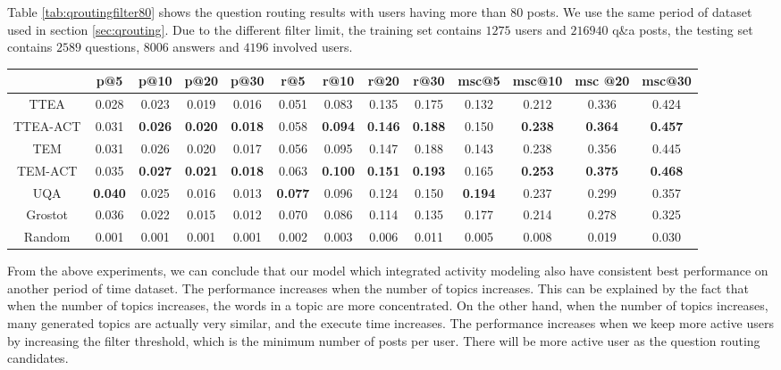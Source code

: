{{{{{{{Table \ref{tab:qroutingfilter80} shows the question routing results with users having more than 80 posts. We use the same period of dataset used in section \ref{sec:qrouting}. Due to the different filter limit, the training set contains $1275$ users and $216940$ q\&a posts, the testing set contains $2589$ questions, $8006$ answers and $4196$ involved users.
\begin{sidewaystable}
\caption{Question Routing experiments,  with users having more than 80 posts}
\label{tab:qroutingfilter80}
\centering
\begin{tabular}{|c|c|c|c|c|c|c|c|c|c|c|c|c|}
\hline
 & p@5    &p@10    &p@20   & p@30 &r@5 & r@10 & r@20 &r@30 & msc@5 & msc@10 &msc @20 &msc@30  \\ \hline
TTEA&0.028&0.023&0.019&0.016&0.051&0.083&0.135&0.175&0.132&0.212&0.336&0.424 \\ \hline
TTEA-ACT&0.031&\textbf{0.026}&\textbf{0.020}&\textbf{0.018}&0.058&\textbf{0.094}&\textbf{0.146}&\textbf{0.188}&0.150&\textbf{0.238}&\textbf{0.364}&\textbf{0.457} \\ \hline
TEM&0.031&0.026&0.020&0.017&0.056&0.095&0.147&0.188&0.143&0.238&0.356&0.445 \\ \hline
TEM-ACT&0.035&\textbf{0.027}&\textbf{0.021}&\textbf{0.018}&0.063&\textbf{0.100}&\textbf{0.151}&\textbf{0.193}&0.165  &\textbf{0.253}&\textbf{0.375}&\textbf{0.468} \\ \hline
UQA&\textbf{0.040}&0.025&0.016&0.013&\textbf{0.077}&0.096&0.124&0.150&\textbf{0.194}&0.237&0.299&0.357 \\ \hline
Grostot&0.036&0.022&0.015&0.012&0.070&0.086&0.114&0.135&0.177&0.214&0.278&0.325 \\ \hline
Random&0.001&0.001&0.001&0.001&0.002&0.003&0.006&0.011&0.005&0.008&0.019&0.030 \\ \hline
\end{tabular}
\end{sidewaystable}

From the above experiments, we can conclude that our model which integrated activity modeling also have consistent best performance on another period of time dataset. 
The performance increases when the number of topics increases. This can be explained by the fact that when the number of topics increases, the words in a topic are more concentrated. On the other hand, when the number of topics increases, many generated topics are actually very similar, and the execute time increases. 
The performance increases when we keep more active users by increasing the filter threshold, which is the minimum number of posts per user. 
There will be more active user as the question routing candidates.




}}}}}}}
